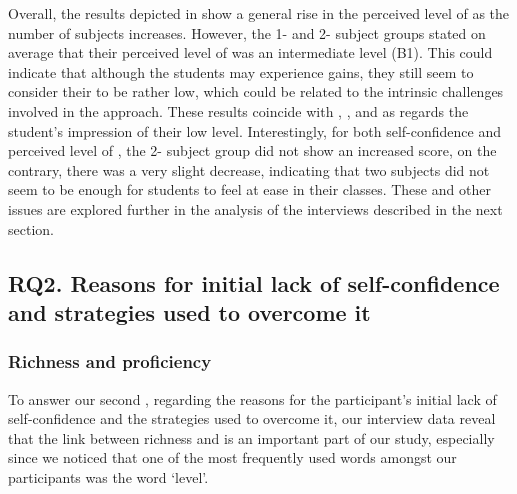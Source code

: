 \documentclass[output=paper]{langsci/langscibook}
\begin{document}
\newpage 
Overall, the results depicted in  show a general rise in the perceived level of  as the number of subjects increases. However, the 1- and 2- subject groups stated on average that their perceived level of  was an intermediate level (B1). This could indicate that although the students may experience  gains, they still seem to consider their  to be rather low, which could be related to the intrinsic challenges involved in the  approach. These results coincide with \citet{Arnó-MaciàMancho-Barés2015}, \citet{Muñoz2001}, and \citet{FeixasEtAl2009}  as  regards the student’s impression of their low  level. Interestingly, for both  self-confidence and perceived level of , the 2- subject group did not show an increased score, on the contrary, there was a very slight decrease, indicating that two  subjects did not seem to be enough for students to feel at ease in their classes. These and other issues are explored further in the analysis of the interviews described in the next section. 


\subsection{RQ2. Reasons for initial lack of self-confidence and strategies used to overcome it}
\subsubsection{Richness and proficiency} 

To answer our second , regarding the reasons for the participant’s initial lack of self-confidence and the strategies used to overcome it, our interview data reveal that the link between richness and  is an important part of our study, especially since we noticed that one of the most frequently used words amongst our participants was the word ‘level’. 
\end{document}
